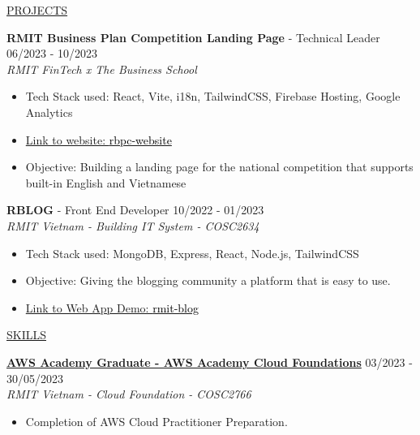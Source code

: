 \documentclass[11pt]{article}
\newcommand{\betteruline}[1]{
    \uline{#1}
}
\newcommand{\sectiontitle}[1]{
    \begingroup
        \titlebold
        \betteruline{\Large\uppercase{#1}  }
        \vspace{1.7mm}
    \endgroup
}
\newcommand{\sectioncontent}[1]{
    \begingroup
        \begin{FlushLeft}
        \vspace{-3mm}
        \sffamily\small#1
        \end{FlushLeft}
    \endgroup
    \vspace{2mm}
}
\newcommand{\job}[3]{
    \begingroup
        \textbf{\small#1} - \small#2
        \hfill\color{black!70}\small{#3}
    \endgroup
}
\newcommand{\project}[2]{
    \begingroup
        \textbf{\small#1}
        \hfill\color{black!70}\small{#2}
    \endgroup
}
\newcommand{\spacevv}{
    \vspace{2mm}
}
\begin{document}
\begin{paracol}{2}
    \sectiontitle{Projects}
    \sectioncontent{
    \job{RMIT Business Plan Competition Landing Page}{Technical Leader}{06/2023 - 10/2023} \\
      \textcolor{black!70}{\textit{RMIT FinTech x The Business School}}
\vspace{1mm}
      \begin{itemize}
        \item Tech Stack used: React, Vite, i18n, TailwindCSS, Firebase Hosting, Google Analytics
        \item  \href{https://rbpc-website.web.app/}{Link to website: \textcolor{black}{rbpc-website}}
\vspace{1mm}
        \item Objective: Building a landing page for the national competition that supports built-in English and Vietnamese
      \end{itemize}
      \spacevv
\vspace{2mm}
    \job{RBLOG}{Front End Developer}{10/2022 - 01/2023} \\
      \textcolor{black!70}{\textit{RMIT Vietnam - Building IT System - COSC2634}}
\vspace{1mm}
      \begin{itemize}
        \item Tech Stack used: MongoDB, Express, React, Node.js, TailwindCSS
\vspace{1mm}
        \item Objective: Giving the blogging community a platform that is easy to use.
\vspace{1mm}
        \item  \href{https://rmit-blog.netlify.app/}{Link to Web App Demo: \textcolor{black}{rmit-blog}}
      \end{itemize}
      \spacevv
\vspace{2mm}
    }


    \sectiontitle{Skills}
    \sectioncontent{
    \vspace{1mm}
        \project{\href{https://www.credly.com/badges/20c053cd-785a-4100-bc79-bd1c902d5c28/public_url}{AWS Academy Graduate - AWS Academy Cloud Foundations}}{03/2023 - 30/05/2023} \\
    \vspace{1mm}
        \textcolor{black!70}{\textit{RMIT Vietnam - Cloud Foundation - COSC2766}}
        \vspace{1mm}
        \begin{itemize}
            \item  Completion of AWS Cloud Practitioner Preparation.
            \vspace{1mm} 
        \end{itemize}
        \spacevv

}
\end{paracol}
\end{document}
